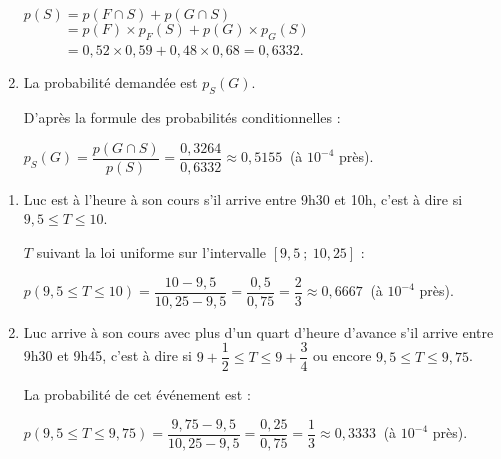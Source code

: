 \begin{corrige}
\begin{enumerate}
          \par
          $p(S)=p(F\cap S) + p(G\cap S)$\\
          $\phantom{p(S)}=p(F) \times p_F(S) + p(G) \times p_{G}(S)$\\
          $\phantom{p(S)} = 0,52 \times 0,59 +0,48 \times 0,68=0,6332$.
          \item %
          La probabilité demandée est $p_S(G)$.
          \par
          D'après la formule des probabilités conditionnelles :
          \par
          $p_S(G)=\dfrac{p(G\cap S)}{p(S)}=\dfrac{0,3264}{0,6332} \approx 0,5155\ $ (à $10^{-4}$ près).
          \par
     \end{enumerate}
     \par
     \par
     \begin{enumerate}
          \item %
          Luc est à l'heure à son cours s'il arrive entre 9h30 et 10h, c'est à dire si $9,5 \leqslant T \leqslant 10$.
          \par
          $T$ suivant la loi uniforme sur l'intervalle $[9,5~;~10,25]$ :
          \par
          $p(9,5 \leqslant T \leqslant 10)=\dfrac{10-9,5}{10,25-9,5}=\dfrac{0,5}{0,75}=\dfrac{2}{3} \approx 0,6667\ $ (à $10^{-4}$ près).
          \par
          \item %
          Luc arrive à son cours avec plus d'un quart d'heure d'avance s'il arrive entre 9h30 et 9h45, c'est à dire si ${9+\dfrac{1}{2} \leqslant T \leqslant 9+\dfrac{3}{4}}$ ou encore ${9,5 \leqslant T \leqslant 9,75}$.
          \par
          La probabilité de cet événement est :
          \par
          $p(9,5 \leqslant T \leqslant 9,75)=\dfrac{9,75-9,5}{10,25-9,5}=\dfrac{0,25}{0,75}=\dfrac{1}{3} \approx 0,3333\ $ (à $10^{-4}$ près).

\end{enumerate}
\end{corrige}
